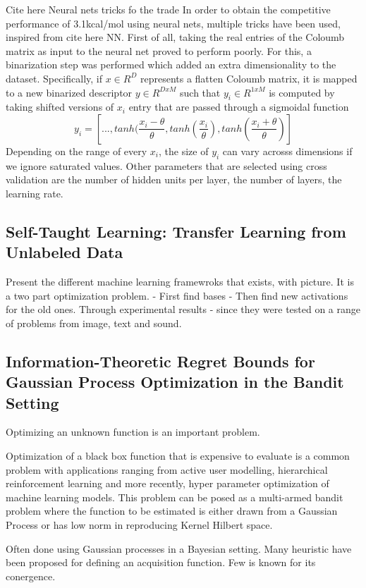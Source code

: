 \documentclass[10pt,journal,a4paper]{IEEEtran}
\begin{document}
Cite here Neural nets tricks fo the trade
In order to obtain the competitive performance of 3.1kcal/mol using neural nets, multiple tricks have been used, inspired from cite here NN. First of all, taking the real entries of the Coloumb matrix as input to the neural net proved to perform poorly.
For this, a binarization step was performed which added an extra dimensionality to the dataset. Specifically, if $x \in R^{D}$ represents a flatten Coloumb matrix, it is mapped to a new binarized descriptor $y \in R^{DxM}$ such that $y_i \in R^{1xM}$ is computed by taking shifted versions of $x_i$ entry that are passed through a sigmoidal function
\begin{equation}
	y_i = [..., tanh(\frac{x_i - \theta}{\theta}, tanh(\frac{x_i}{\theta}), tanh(\frac{x_i + \theta}{\theta})]
\end{equation}
Depending on the range of every  $x_i$, the size of $y_i$ can vary acrosss dimensions if we ignore saturated values.
Other parameters that are selected using cross validation are the number of hidden units per layer, the number of layers, the learning rate.

\subsection{Self-Taught Learning: Transfer Learning from Unlabeled Data}
Present the different machine learning framewroks that exists, with picture.
It is a two part optimization problem.
	- First find bases
	- Then find new activations for the old ones.
Through experimental results - since they were tested on a range of problems from image, text and sound.
\subsection{Information-Theoretic Regret Bounds for Gaussian Process Optimization in the Bandit Setting}
Optimizing an unknown function is an important problem.

Optimization of a black box function that is expensive to evaluate is a common problem with applications ranging from active user modelling, hierarchical reinforcement learning and more recently, hyper parameter optimization of machine learning models. This problem can be posed as a multi-armed bandit problem where the function to be estimated is either drawn from a Gaussian Process or has low norm in reproducing Kernel Hilbert space.

Often done using Gaussian processes in a Bayesian setting. Many heuristic have been proposed for defining an acquisition function. Few is known for its conergence.
\end{document}
